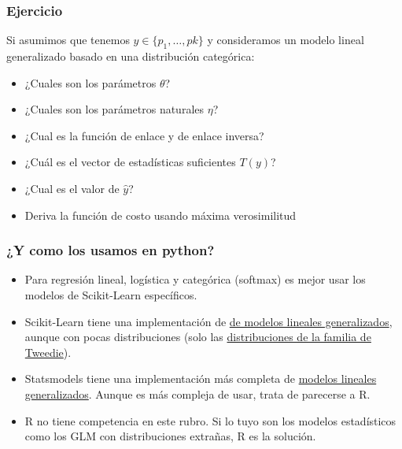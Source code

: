\documentclass{beamer}
\begin{document}
\begin{frame}
  \frametitle{Ejercicio}

  Si asumimos que tenemos $y \in \{p_1, \ldots, pk\}$ y consideramos un modelo lineal generalizado basado en una distribución categórica:
  \begin{itemize}
    \item ¿Cuales son los parámetros $\theta$?
    \item ¿Cuales son los parámetros naturales $\eta$?
    \item ¿Cual es la función de enlace y de enlace inversa?
    \item ¿Cuál es el vector de estadísticas suficientes $T(y)$?
    \item ¿Cual es el valor de $\hat{y}$?
    \item Deriva la función de costo usando máxima verosimilitud
  \end{itemize}

\end{frame}

\begin{frame}
  \frametitle{¿Y como los usamos en python?}

  \begin{itemize}
    \item Para regresión lineal, logística y categórica (softmax) es mejor usar los modelos de Scikit-Learn específicos.
    \item Scikit-Learn tiene una implementación de \href{https://scikit-learn.org/stable/modules/linear_model.html\#generalized-linear-models}{de modelos lineales generalizados}, aunque con pocas distribuciones (solo las \href{https://en.wikipedia.org/wiki/Tweedie_distribution}{distribuciones de la familia de Tweedie}).
    \item Statsmodels tiene una implementación más completa de \href{https://www.statsmodels.org/stable/glm.html}{modelos lineales generalizados}. Aunque es más compleja de usar, trata de parecerse a R.
    \item R no tiene competencia en este rubro. Si lo tuyo son los modelos estadísticos como los GLM con distribuciones extrañas, R es la solución.
  \end{itemize}
\end{frame}
\end{document}
